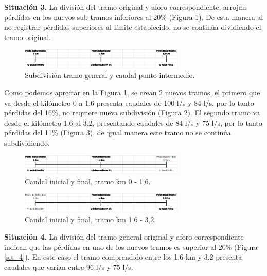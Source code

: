 \documentclass[]{article}
\begin{document}
\textbf{Situación 3.} La división del tramo original y aforo correspondiente, arrojan pérdidas en los nuevos sub-tramos inferiores al 20\% (Figura \ref{sit_3}). De esta manera al no registrar pérdidas superiores al límite establecido, no se continúa dividiendo el tramo original.\\

\begin{figure}[H]
\centering
\includegraphics[width=0.7\textwidth]{images/sit_3.eps}
\caption{Subdivisión tramo general y caudal punto intermedio.}
\label{sit_3}
\end{figure}

Como podemos apreciar en la Figura \ref{sit_3}, se crean 2 nuevos tramos, el primero que va desde el kilómetro 0 a 1,6 presenta caudales de 100 l/s y 84 l/s, por lo tanto pérdidas del 16\%, no requiere nueva subdivisión (Figura \ref{sit_3_1}). El segundo tramo va desde el kilómetro 1,6 al 3,2, presentando caudales de 84 l/s y 75 l/s, por lo tanto pérdidas del 11\% (Figura \ref{sit_3_2}), de igual manera este tramo no se continúa subdividiendo.\\

\begin{figure}[H]
\centering
\includegraphics[width=0.7\textwidth]{images/sit_3_1.eps}
\caption{Caudal inicial y final, tramo km 0 - 1,6.}
\label{sit_3_1}
\end{figure}

\begin{figure}[H]
\centering
\includegraphics[width=0.7\textwidth]{images/sit_3_2.eps}
\caption{Caudal inicial y final, tramo km 1,6 - 3,2.}
\label{sit_3_2}
\end{figure}

\textbf{Situación 4.} La división del tramo general original y aforo correspondiente indican que las pérdidas en uno de los nuevos tramos es superior al 20\% (Figura \ref{sit_4}). En este caso el tramo comprendido entre los 1,6 km y 3,2 presenta caudales que varían entre 96 l/s y 75 l/s.\\
\end{document}
